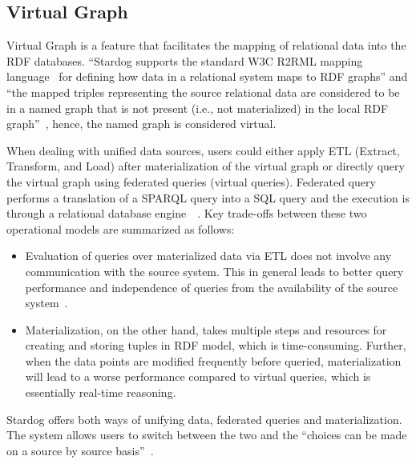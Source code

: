 	\subsection{Virtual Graph}
		Virtual Graph is a feature that facilitates the mapping of relational data 
		into the RDF databases. ``Stardog supports the standard W3C R2RML 
		mapping language~\cite{hid-sp18-405-www-stardog-r2rml} for defining 
		how data in a relational system maps to RDF graphs'' and ``the mapped 
		triples representing the source relational data are considered to be in a 
		named graph that is not present (i.e., not materialized) in the local RDF 
		graph''~\cite{hid-sp18-405-blog-stardog-virtual}, hence, the named 
		graph is considered virtual.
		
		When dealing with unified data sources, users could either apply ETL 
		(Extract, Transform, and Load) after materialization of the virtual graph 
		or 	directly query the virtual graph using federated queries (virtual 
		queries). Federated query performs a translation of a SPARQL query into 
		a SQL query and the execution is through a relational database 
		engine~\cite{hid-sp18-405-blog-stardog-virtual2}~\cite{hid-sp18-405-diego2017ontop-stardog}.
		Key trade-offs between these two operational models are summarized 
		as follows:
		
		 \begin{itemize}
		 	
			\item Evaluation of queries over materialized data via ETL does not 
			involve any communication with the source system. This in general 
			leads to better query performance and independence of queries from 
			the availability of the source 
			system~\cite{hid-sp18-405-blog-stardog-virtual}.
			
			\item Materialization, on the other hand, takes multiple steps and 
			resources for creating and storing tuples in RDF model, which is 
			time-consuming. Further, when the data points are modified 
			frequently before queried, materialization will lead to a worse 
			performance compared to virtual queries, which is essentially 
			real-time reasoning.
			
		\end{itemize}
	
		Stardog offers both ways of unifying data, federated queries and 
		materialization. The system allows users to switch between the two and 
		the ``choices can be made on a source by source 
		basis''~\cite{hid-sp18-405-blog-stardog-virtual}.
	

